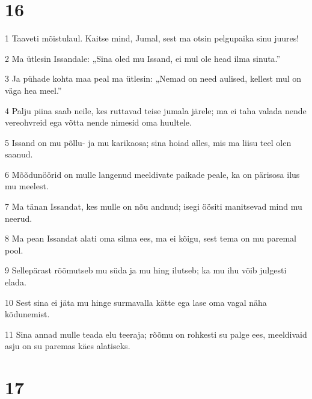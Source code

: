 \chapter{16}

\par 1 Taaveti mõistulaul. Kaitse mind, Jumal, sest ma otsin pelgupaika sinu juures!
\par 2 Ma ütlesin Issandale: „Sina oled mu Issand, ei mul ole head ilma sinuta.”
\par 3 Ja pühade kohta maa peal ma ütlesin: „Nemad on need aulised, kellest mul on väga hea meel.”
\par 4 Palju piina saab neile, kes ruttavad teise jumala järele; ma ei taha valada nende vereohvreid ega võtta nende nimesid oma huultele.
\par 5 Issand on mu põllu- ja mu karikaosa; sina hoiad alles, mis ma liisu teel olen saanud.
\par 6 Mõõdunöörid on mulle langenud meeldivate paikade peale, ka on pärisosa ilus mu meelest.
\par 7 Ma tänan Issandat, kes mulle on nõu andnud; isegi öösiti manitsevad mind mu neerud.
\par 8 Ma pean Issandat alati oma silma ees, ma ei kõigu, sest tema on mu paremal pool.
\par 9 Sellepärast rõõmutseb mu süda ja mu hing ilutseb; ka mu ihu võib julgesti elada.
\par 10 Sest sina ei jäta mu hinge surmavalla kätte ega lase oma vagal näha kõdunemist.
\par 11 Sina annad mulle teada elu teeraja; rõõmu on rohkesti su palge ees, meeldivaid asju on su paremas käes alatiseks.

\chapter{17}

